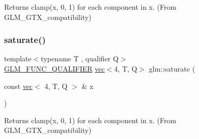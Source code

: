 Returns clamp(x, 0, 1) for each component in x. (From G\+L\+M\+\_\+\+G\+T\+X\+\_\+compatibility) 

\mbox{\label{group__gtx__compatibility_ga356f8c3a7e7d6376d3d4b0a026407183}} 
\subsubsection{\texorpdfstring{saturate()}{saturate()}\hspace{0.1cm}{\footnotesize\ttfamily [4/4]}}
{\footnotesize\ttfamily template$<$typename T , qualifier Q$>$ \\
\mbox{\hyperlink{setup_8hpp_a33fdea6f91c5f834105f7415e2a64407}{G\+L\+M\+\_\+\+F\+U\+N\+C\+\_\+\+Q\+U\+A\+L\+I\+F\+I\+ER}} \mbox{\hyperlink{structglm_1_1vec}{vec}}$<$4, T, Q$>$ glm\+::saturate (\begin{DoxyParamCaption}\item[{const \mbox{\hyperlink{structglm_1_1vec}{vec}}$<$ 4, T, Q $>$ \&}]{x }\end{DoxyParamCaption})}



Returns clamp(x, 0, 1) for each component in x. (From G\+L\+M\+\_\+\+G\+T\+X\+\_\+compatibility) 

